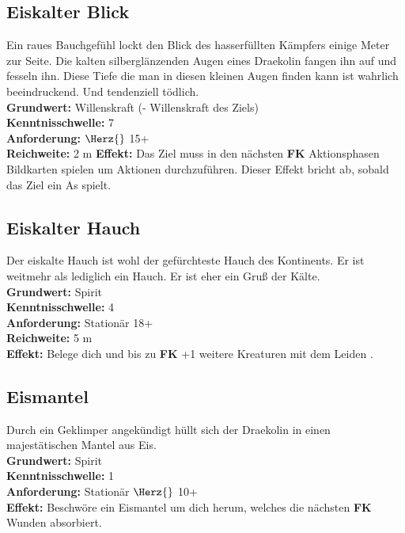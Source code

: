 \subsection*{Eiskalter Blick} \label{sk:eiskalter_blick}
Ein raues Bauchgefühl lockt den Blick des hasserfüllten Kämpfers einige Meter zur Seite. Die kalten silberglänzenden Augen eines Draekolin fangen ihn auf und fesseln ihn. Diese Tiefe die man in diesen kleinen Augen finden kann ist wahrlich beeindruckend. Und tendenziell tödlich.\\
\textbf{Grundwert:} Willenskraft (- Willenskraft des Ziels) \\
\textbf{Kenntnisschwelle:} 7 \\
\textbf{Anforderung:} $\Herz{}$ 15+ \\
\textbf{Reichweite:} 2 m
\textbf{Effekt:} Das Ziel muss in den nächsten \textbf{FK} Aktionsphasen Bildkarten spielen um Aktionen durchzuführen. Dieser Effekt bricht ab, sobald das Ziel ein As spielt.

\subsection*{Eiskalter Hauch} \label{sk:eiskalter_hauch}
Der eiskalte Hauch ist wohl der gefürchteste Hauch des Kontinents. Er ist weitmehr als lediglich ein Hauch. Er ist eher ein Gruß der Kälte. \\
\textbf{Grundwert:} Spirit \\
\textbf{Kenntnisschwelle:} 4 \\
\textbf{Anforderung:} Stationär 18+ \\
\textbf{Reichweite:} 5 m\\
\textbf{Effekt:} Belege dich und bis zu \textbf{FK} +1 weitere Kreaturen mit dem Leiden \textit{}.

\subsection*{Eismantel} \label{sk:eismantel}
Durch ein Geklimper angekündigt hüllt sich der Draekolin in einen majestätischen Mantel aus Eis. \\
\textbf{Grundwert:} Spirit \\
\textbf{Kenntnisschwelle:} 1 \\
\textbf{Anforderung:} Stationär $\Herz{}$ 10+ \\
\textbf{Effekt:} Beschwöre ein Eismantel um dich herum, welches die nächsten \textbf{FK} Wunden absorbiert.

